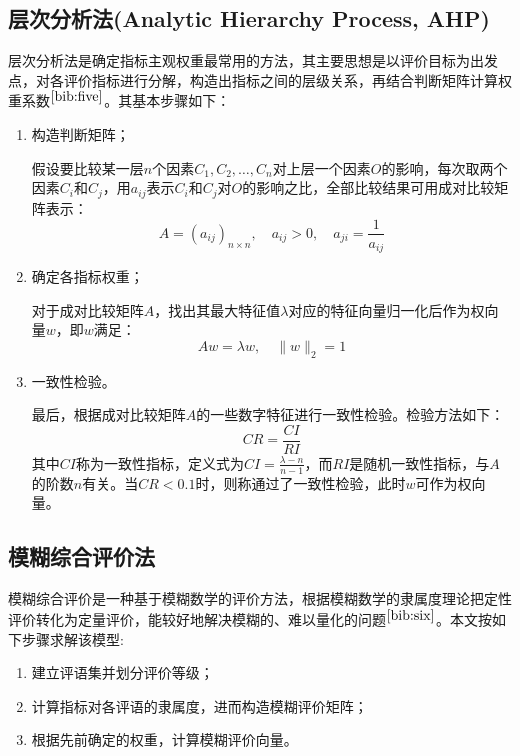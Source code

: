 \documentclass[bwprint]{cumcmthesis}
\begin{document}
        \subsection{层次分析法(Analytic Hierarchy Process, AHP)}
        层次分析法是确定指标主观权重最常用的方法，其主要思想是以评价目标为出发点，对各评价指标进行分解，构造出指标之间的层级关系，再结合判断矩阵计算权重系数$^{\cite{bib:five}}$。其基本步骤如下：
        \begin{enumerate}
            \item 构造判断矩阵；
            
            假设要比较某一层$n$个因素$C_1,C_2,\dots,C_n$对上层一个因素$O$的影响，每次取两个因素$C_i$和$C_j$，用$a_{ij}$表示$C_i$和$C_j$对$O$的影响之比，全部比较结果可用成对比较矩阵表示：
            \begin{equation}
                \label{eq:AHP1}
                A = (a_{ij})_{n\times n},\quad a_{ij}>0,\quad a_{ji} = \frac{1}{a_{ij}}
            \end{equation}
            \item 确定各指标权重；
            
            对于成对比较矩阵$A$，找出其最大特征值$\lambda$对应的特征向量归一化后作为权向量$w$，即$w$满足：
            \begin{equation}
                \label{eq:AHP2}
                Aw=\lambda w,\quad \|w\|_2 = 1
            \end{equation}
            \item 一致性检验。
        
            最后，根据成对比较矩阵$A$的一些数字特征进行一致性检验。检验方法如下：
            \begin{equation}
                \label{eq:AHP3}
                CR = \frac{CI}{RI}
            \end{equation}
            其中$CI$称为一致性指标，定义式为$CI=\frac{\lambda-n}{n-1}$，而$RI$是随机一致性指标，与$A$的阶数$n$有关。当$CR<0.1$时，则称通过了一致性检验，此时$w$可作为权向量。
        \end{enumerate}

        \subsection{模糊综合评价法}
        模糊综合评价是一种基于模糊数学的评价方法，根据模糊数学的隶属度理论把定性评价转化为定量评价，能较好地解决模糊的、难以量化的问题$^{\cite{bib:six}}$。本文按如下步骤求解该模型:
        \begin{enumerate}
            \item 建立评语集并划分评价等级；
            \item 计算指标对各评语的隶属度，进而构造模糊评价矩阵；
            \item 根据先前确定的权重，计算模糊评价向量。
        \end{enumerate}
\end{document}
